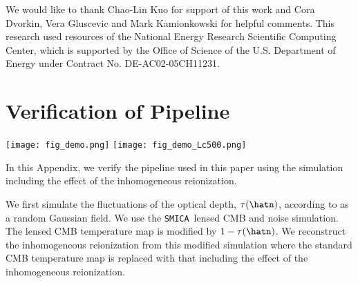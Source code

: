 \documentclass[aps,prd,twocolumn,superscriptaddress,groupedaddress,nofootinbib]{revtex4}
\def\SMICA{{\tt SMICA}}
\begin{document}
\begin{acknowledgments}
We would like to thank Chao-Lin Kuo for support of this work and 
Cora Dvorkin, Vera Gluscevic and Mark Kamionkowski for helpful comments. 
This research used resources of the National Energy Research Scientific Computing Center, 
which is supported by the Office of Science of the U.S. Department of Energy under Contract No. DE-AC02-05CH11231.
\end{acknowledgments}

\appendix

\section{Verification of Pipeline} \label{verify}

\begin{figure*}[t]
\bc
\texttt{[image: fig\_demo.png]} 
\texttt{[image: fig\_demo\_Lc500.png]} 
\caption{
{\it Left}: 
The power spectrum of the inhomogeneous reionization reconstructed from 
the simulated temperature map including the effect of the patchy reionization. 
We employ the lensed CMB signal and anisotropic noise maps of the \SMICA\ FFP8.1 simulation. 
The baseline mask (the lensing mask with the $1$deg apodization) is used. 
We assume $A^\tau=1$ and $L_c=2000$. 
{\it Right}: 
Same as Left but with $L_c=500$.
}
\label{fig:demo}
\ec
\end{figure*}


In this Appendix, we verify the pipeline used in this paper using the simulation including the effect 
of the inhomogeneous reionization. 

We first simulate the fluctuations of the optical depth, $\tau(\hatn)$, according to  
as a random Gaussian field. We use the \SMICA\ lensed CMB and noise simulation. 
The lensed CMB temperature map is modified by $1-\tau(\hatn)$. 
We reconstruct the inhomogeneous reionization from this modified simulation where the standard CMB temperature 
map is replaced with that including the effect of the inhomogeneous reionization. 
\end{document}
